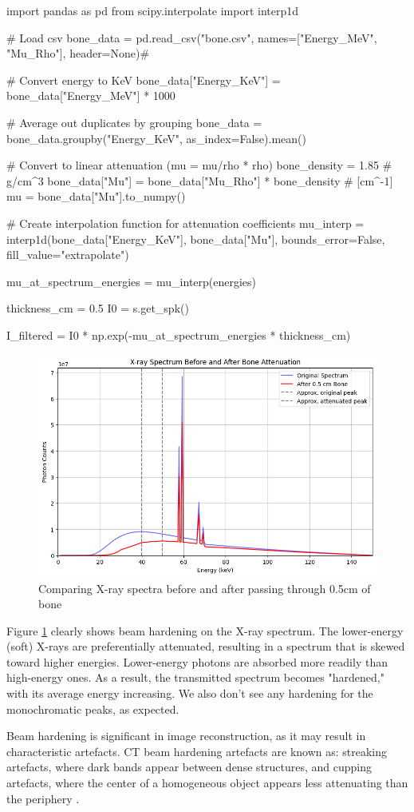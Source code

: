 \documentclass{article}
\begin{document}
\begin{python}
import pandas as pd
from scipy.interpolate import interp1d

# Load csv
bone_data = pd.read_csv("bone.csv", names=["Energy_MeV", "Mu_Rho"], header=None)#

# Convert energy to KeV
bone_data["Energy_KeV"] = bone_data["Energy_MeV"] * 1000

# Average out duplicates by grouping
bone_data = bone_data.groupby("Energy_KeV", as_index=False).mean()

# Convert to linear attenuation (mu = mu/rho * rho)
bone_density = 1.85  # g/cm^3
bone_data["Mu"] = bone_data["Mu_Rho"] * bone_density  # [cm^-1]
mu = bone_data["Mu"].to_numpy()

# Create interpolation function for attenuation coefficients
mu_interp = interp1d(bone_data["Energy_KeV"], bone_data["Mu"], bounds_error=False, fill_value="extrapolate")

mu_at_spectrum_energies = mu_interp(energies)

thickness_cm = 0.5
I0 = s.get_spk()

I_filtered = I0 * np.exp(-mu_at_spectrum_energies * thickness_cm)
\end{python}

\begin{figure}[H]
	\includegraphics[width=\linewidth]{beamhardening.png}
	\caption{Comparing X-ray spectra before and after passing through 0.5cm of bone}
  \label{fig:beamhardening}
\end{figure}

Figure \ref{fig:beamhardening} clearly shows beam hardening on the X-ray spectrum. The lower-energy (soft) X-rays are preferentially attenuated, resulting in a spectrum that is skewed toward higher energies. Lower-energy photons are absorbed more readily than high-energy ones. As a result, the transmitted spectrum becomes "hardened," with its average energy increasing. We also don't see any hardening for the monochromatic peaks, as expected. 

Beam hardening is significant in image reconstruction, as it may result in characteristic artefacts. CT beam hardening artefacts are known as: streaking artefacts, where dark bands appear between dense structures, and cupping artefacts, where the center of a homogeneous object appears less attenuating than the periphery \cite{Murphy_2016}.



\end{document}
